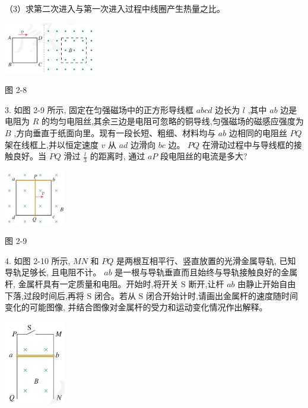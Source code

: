 \documentclass[10pt]{article}
\begin{document}
（3）求第二次进入与第一次进入过程中线圈产生热量之比。

\begin{center}
\includegraphics[max width=0.3\textwidth]{images/01910e72-c5b7-7ed5-a6d4-fb3a5faefc32_51_622924.jpg}
\end{center}

图 2-8

3. 如图 2-9 所示, 固定在匀强磁场中的正方形导线框 \({abcd}\) 边长为 \(l\) ,其中 \({ab}\) 边是电阻为 \(R\) 的均匀电阻丝,其余三边是电阻可忽略的铜导线,匀强磁场的磁感应强度为 \(B\) ,方向垂直于纸面向里。现有一段长短、粗细、材料均与 \({ab}\) 边相同的电阻丝 \({PQ}\) 架在线框上,并以恒定速度 \(v\) 从 \({ad}\) 边滑向 \({bc}\) 边。 \({PQ}\) 在滑动过程中与导线框的接触良好。当 \({PQ}\) 滑过 \(\frac{l}{3}\) 的距离时, 通过 \({aP}\) 段电阻丝的电流是多大?

\begin{center}
\includegraphics[max width=0.2\textwidth]{images/01910e72-c5b7-7ed5-a6d4-fb3a5faefc32_52_692434.jpg}
\end{center}

图 2-9

4. 如图 2-10 所示, \({MN}\) 和 \({PQ}\) 是两根互相平行、竖直放置的光滑金属导轨, 已知导轨足够长, 且电阻不计。 \({ab}\) 是一根与导轨垂直而且始终与导轨接触良好的金属杆, 金属杆具有一定质量和电阻。开始时,将开关 \(\mathrm{S}\) 断开,让杆 \({ab}\) 由静止开始自由下落,过段时间后,再将 \(\mathrm{S}\) 闭合。若从 \(\mathrm{S}\) 闭合开始计时,请画出金属杆的速度随时间变化的可能图像, 并结合图像对金属杆的受力和运动变化情况作出解释。

\begin{center}
\includegraphics[max width=0.2\textwidth]{images/01910e72-c5b7-7ed5-a6d4-fb3a5faefc32_52_642518.jpg}
\end{center}
\end{document}

